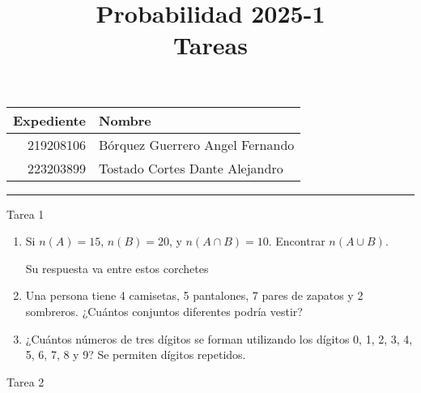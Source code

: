 \documentclass[a4paper, 12pt]{article}
\title
{
  Probabilidad 2025-1 \\
  Tareas
}
\newcommand{\Pspace}{0.5cm}
\newcommand{\Aspace}{0.2cm}
\begin{document}
\maketitle

\begin{center}
    \begin{tabular}{r|l}
        \textbf{Expediente} & \textbf{Nombre} \\ \hline
        219208106 & Bórquez Guerrero Angel Fernando \\
        223203899 & Tostado Cortes Dante Alejandro \\
    \end{tabular}
\end{center}

\rule{\linewidth}{0.3mm}



\vspace{0.3cm}

\begin{center}
    { \LARGE Tarea 1}
\end{center}

\begin{enumerate}
    \item Si $n(A) = 15$, $n(B) = 20$, y $n(A \cap B) = 10$. Encontrar $n(A \cup B).$ 
    \vspace{\Aspace} \par
    { \color{azul} Su respuesta va entre estos corchetes }


    \vspace{\Pspace}
    \item Una persona tiene 4 camisetas, 5 pantalones, 7 pares de zapatos y 2 sombreros. ¿Cuántos conjuntos diferentes podría vestir?
    \vspace{\Aspace} \par
    { \color{azul}  }


    \vspace{\Pspace}
    \item ¿Cuántos números de tres dígitos se forman utilizando los dígitos 0, 1, 2, 3, 4, 5, 6, 7, 8 y 9? Se permiten dígitos repetidos.
    \vspace{\Aspace} \par
    { \color{azul}  } 
\end{enumerate}



\newpage
\begin{center}
    { \LARGE Tarea 2}
\end{center}
\end{document}
